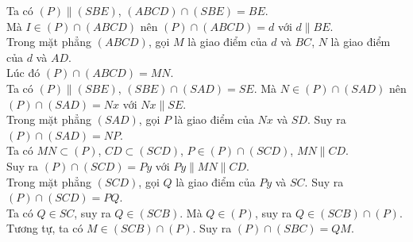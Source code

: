 \begin{ex}
{\begin{center}
		\end{center}
		Ta có $(P)\parallel (SBE)$, $(ABCD) \cap(SBE)=BE$.\\ 
		Mà $I \in (P) \cap(ABCD)$  nên $(P) \cap(ABCD)= d$ với $d \parallel BE$.\\
		Trong mặt phẳng $(ABCD)$, gọi $M$ là giao điểm của $d$ và $BC$, $N$ là  giao điểm của $d$ và $AD$.\\
		Lúc đó $(P) \cap (ABCD)=MN$.\\ 
		Ta có $(P)\parallel (SBE)$, $(SBE) \cap (SAD)=SE$. Mà $N\in  (P) \cap(SAD)$ nên $(P)\cap(SAD)=Nx$ với $Nx \parallel SE$.\\
		Trong mặt phẳng $(SAD)$, gọi $P$ là giao điểm của $Nx$ và $SD$. Suy ra  $(P) \cap(SAD)=NP$.\\
		Ta có $MN \subset (P)$,  $CD\subset(SCD)$, $P\in (P)\cap(SCD)$, $MN \parallel CD$.\\
		Suy ra $(P)  \cap(SCD)=Py$ với $Py \parallel MN \parallel CD$.\\
		Trong mặt phẳng $(SCD)$, gọi $Q$ là giao điểm của $Py$ và  $SC$. Suy ra $(P)\cap(SCD)=PQ$.\\
		Ta có $Q \in SC$, suy ra $Q \in(SCB)$. Mà $Q \in(P)$, suy ra $Q  \in(SCB) \cap(P)$.\\
		Tương tự, ta có $M  \in (SCB) \cap(P)$. Suy ra $(P) \cap(SBC)=QM$.\\
	} 
\end{ex}

